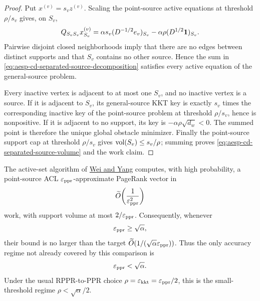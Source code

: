 \begin{proof}
Put $x^{(v)}=s_vz^{(v)}$.  Scaling the point-source active equations at
threshold $\rho/s_v$ gives, on $S_v$,
\begin{equation*}
 Q_{S_vS_v}x^{(v)}_{S_v}
 =\alpha s_v(D^{-1/2}e_v)_{S_v}
  -\alpha\rho(D^{1/2}\mathbf{1})_{S_v}.
\end{equation*}
Pairwise disjoint closed neighborhoods imply that there are no edges between
distinct supports and that $S_v$ contains no other source.  Hence the sum
in \cref{eq:aesp-cd-separated-source-decomposition} satisfies every active
equation of the general-source problem.

Every inactive vertex is adjacent to at most one $S_v$, and no inactive
vertex is a source.  If it is adjacent to $S_v$, its general-source KKT key
is exactly $s_v$ times the corresponding inactive key of the point-source
problem at threshold $\rho/s_v$, hence is nonpositive.  If it is adjacent
to no support, its key is $-\alpha\rho\sqrt{d_w}<0$.  The summed point is
therefore the unique global obstacle minimizer.  Finally the point-source
support cap at threshold $\rho/s_v$ gives
\(\operatorname{vol}(S_v)\leq s_v/\rho\); summing proves
\cref{eq:aesp-cd-separated-source-volume} and the work claim.
\end{proof}

\begin{corollary}
\label{cor:aesp-cd-point-source-coarse-regime}
The active-set algorithm of
\href{https://arxiv.org/abs/2608.16339}{Wei and Yang}
computes, with high probability, a point-source ACL
$\varepsilon_{\mathrm{ppr}}$-approximate PageRank vector in
\begin{equation*}
 \widetilde O\!\left(\frac1{\varepsilon_{\mathrm{ppr}}^2}\right)
\end{equation*}
work, with support volume at most $2/\varepsilon_{\mathrm{ppr}}$.  Consequently, whenever
\begin{equation}
 \varepsilon_{\mathrm{ppr}}\geq\sqrt\alpha,
 \label{eq:aesp-cd-point-source-coarse-regime}
\end{equation}
their bound is no larger than the target
$\widetilde O(1/(\sqrt\alpha\varepsilon_{\mathrm{ppr}}))$.  Thus the only accuracy regime not
already covered by this comparison is
\begin{equation}
 \varepsilon_{\mathrm{ppr}}<\sqrt\alpha.
 \label{eq:aesp-cd-point-source-hard-regime}
\end{equation}
Under the usual RPPR-to-PPR choice
$\rho=\varepsilon_{\mathrm{kkt}}=\varepsilon_{\mathrm{ppr}}/2$, this is the small-threshold regime
$\rho<\sqrt\alpha/2$.
\end{corollary}

